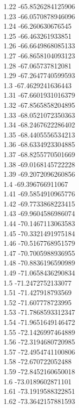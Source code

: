 {1.22	-65.8526284125906\\
1.23	-66.0570878946096\\
1.24	-66.260630676545\\
1.25	-66.463261933851\\
1.26	-66.6649868085133\\
1.27	-66.8658104093123\\
1.28	-67.065737812081\\
1.29	-67.2647740599593\\
1.3	-67.4629241636443\\
1.31	-67.6601931016379\\
1.32	-67.8565858204895\\
1.33	-68.0521072350363\\
1.34	-68.2467622286402\\
1.35	-68.4405556534213\\
1.36	-68.6334923304885\\
1.37	-68.8255770501669\\
1.38	-69.0168145722228\\
1.39	-69.2072096260856\\
1.4	-69.396766911067\\
1.41	-69.5854910965776\\
1.42	-69.7733868223415\\
1.43	-69.9604586986074\\
1.44	-70.1467113063583\\
1.45	-70.3321491975184\\
1.46	-70.5167768951579\\
1.47	-70.7005988936955\\
1.48	-70.8836196590989\\
1.49	-71.0658436290834\\
1.5	-71.2472752133077\\
1.51	-71.427918793569\\
1.52	-71.607778723995\\
1.53	-71.7868593312347\\
1.54	-71.9651649146472\\
1.55	-72.1426997464889\\
1.56	-72.3194680720985\\
1.57	-72.4954741100806\\
1.58	-72.670722052488\\
1.59	-72.8452160650018\\
1.6	-73.0189602871101\\
1.61	-73.1919588322851\\
1.62	-73.3642157881593\\
}
